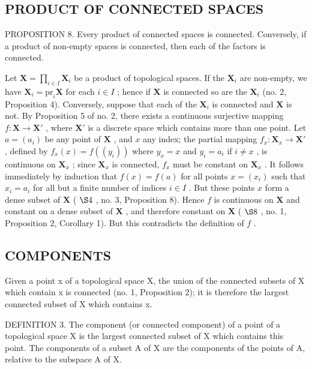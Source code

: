 \subsection{PRODUCT OF CONNECTED SPACES}

PROPOSITION 8. Every product of connected spaces is connected. Conversely, if a product of non-empty spaces is connected, then each of the factors is connected.

Let \(\mathbf{X} = \prod_{i \in I} \mathbf{X}_i\) be a product of topological spaces. If the \(\mathbf{X}_i\) are non-empty, we have \(\mathbf{X}_i = \text{pr}_i\mathbf{X}\) for each \(i \in I\) ; hence if \(\mathbf{X}\) is connected so are the \(\mathbf{X}_i\) (no. 2, Proposition 4). Conversely, suppose that each of the \(\mathbf{X}_i\) is connected and \(\mathbf{X}\) is not. By Proposition 5 of no. 2, there exists a continuous surjective mapping \(f: \mathbf{X} \to \mathbf{X}'\) , where \(\mathbf{X}'\) is a discrete space which contains more than one point. Let \(a = (a_i)\) be any point of \(\mathbf{X}\) , and \(x\) any index; the partial mapping \(f_x: \mathbf{X}_x \to \mathbf{X}'\) , defined by \(f_x(x) = f((y_i))\) where \(y_x = x\) and \(y_i = a_i\) if \(i \neq x\) , is continuous on \(\mathbf{X}_x\) ; since \(\mathbf{X}_x\) is connected, \(f_x\) must be constant on \(\mathbf{X}_x\) . It follows immediately by induction that \(f(x) = f(a)\) for all points \(x = (x_i)\) such that \(x_i = a_i\) for all but a finite number of indices \(i \in I\) . But these points \(x\) form a dense subset of \(\mathbf{X}\) ( \(\S 4\) , no. 3, Proposition 8). Hence \(f\) is continuous on \(\mathbf{X}\) and constant on a dense subset of \(\mathbf{X}\) , and therefore constant on \(\mathbf{X}\) ( \(\S 8\) , no. 1, Proposition 2, Corollary 1). But this contradicts the definition of \(f\) .

\subsection{COMPONENTS}

Given a point x of a topological space X, the union of the connected subsets of X which contain x is connected (no. 1, Proposition 2); it is therefore the largest connected subset of X which contains x.

DEFINITION 3. The component (or connected component) of a point of a topological space X is the largest connected subset of X which contains this point. The components of a subset A of X are the components of the points of A, relative to the subspace A of X.

